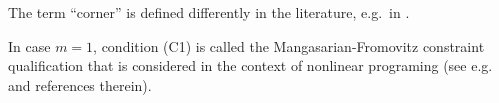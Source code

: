 \documentclass[graybox]{svmult}
\newcommand{\R}{\mathbb{R}}  %
\renewcommand{\AA}{A}  %
\newcommand{\pp}{p}
\begin{document}
\begin{remark}
The term ``corner'' is defined differently in the literature, e.g.~in \cite{Mi}.  
\end{remark}

\begin{remark} In case $m=1$, condition (C1) is called the Mangasarian-Fromovitz constraint qualification that is considered in the context of nonlinear programing (see e.g.~\cite{JJT,P} and references therein).  
\end{remark}





\end{document}
